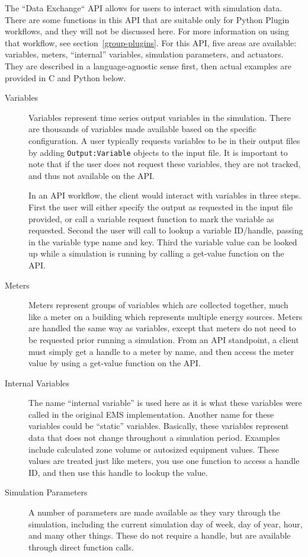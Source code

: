 The ``Data Exchange`` API allows for users to interact with simulation data.
There are some functions in this API that are suitable only for Python Plugin workflows, and they will not be discussed here.
For more information on using that workflow, see section~\ref{group-plugins}.
For this API, five areas are available: variables, meters, ``internal'' variables, simulation parameters, and actuators.
They are described in a language-agnostic sense first, then actual examples are provided in C and Python below.
\begin{description}
 \item[Variables] Variables represent time series output variables in the simulation.
                  There are thousands of variables made available based on the specific configuration.
                  A user typically requests variables to be in their output files by adding \verb=Output:Variable= objects to the input file.
                  It is important to note that if the user does not request these variables, they are not tracked, and thus not available on the API.

                  In an API workflow, the client would interact with variables in three steps.
                  First the user will either specify the output as requested in the input file provided, or call a variable request function to mark the variable as requested.
                  Second the user will call to lookup a variable ID/handle, passing in the variable type name and key.
                  Third the variable value can be looked up while a simulation is running by calling a get-value function on the API.
 \item[Meters] Meters represent groups of variables which are collected together, much like a meter on a building which represents multiple energy sources.
               Meters are handled the same way as variables, except that meters do not need to be requested prior running a simulation.
               From an API standpoint, a client must simply get a handle to a meter by name, and then access the meter value by using a get-value function on the API.
 \item[Internal Variables] The name ``internal variable'' is used here as it is what these variables were called in the original EMS implementation.
                           Another name for these variables could be ``static'' variables.
                           Basically, these variables represent data that does not change throughout a simulation period.
                           Examples include calculated zone volume or autosized equipment values.
                           These values are treated just like meters, you use one function to access a handle ID, and then use this handle to lookup the value.
 \item[Simulation Parameters] A number of parameters are made available as they vary through the simulation, including the current simulation day of week, day of year, hour, and many other things.
                              These do not require a handle, but are available through direct function calls.
\end{description}

